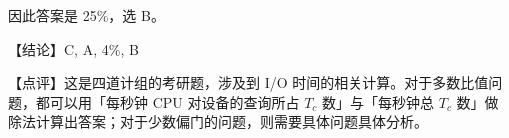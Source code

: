 \documentclass[UTF8]{ctexart}
\begin{document}
因此答案是 25\%，选 B。

\BgThispage
\vspace{1em}
{\color{cyan!80!black}
【结论】C, A, 4\%, B

【点评】这是四道计组的考研题，涉及到 I/O 时间的相关计算。对于多数比值问题，都可以用「每秒钟 CPU 对设备的查询所占 $T_c$ 数」与「每秒钟总 $T_c$ 数」做除法计算出答案；对于少数偏门的问题，则需要具体问题具体分析。
}
\end{document}
